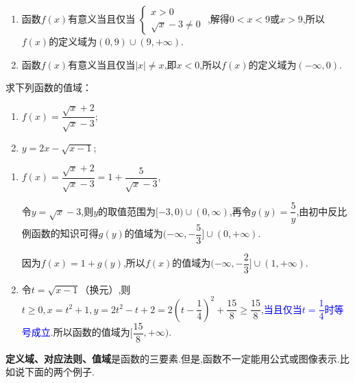 \documentclass[lang=cn,math=cm,chinesefont=nofont,11pt,scheme=chinese,twocol]{elegantbook}
\begin{document}
\begin{solution}
  \begin{enumerate}
    \item 函数$f(x)$有意义当且仅当
     $\begin{cases}
        x>0
        \\\sqrt{x}-3\neq 0
      \end{cases}$
    ,解得$0<x<9$或$x>9$,所以$f(x)$的定义域为$(0,9)\cup (9,+\infty)$.

    \item 函数$f(x)$有意义当且仅当$\left| x \right|\neq x$,即$x<0$,所以$f(x)$的定义域为$(-\infty,0).$
  \end{enumerate}
\end{solution}

\begin{spacing}{2.0}
  \begin{example}
    求下列函数的值域：
  \end{example}
  
  \begin{enumerate}
    \item $f(x)=\dfrac{\sqrt{x}+2}{\sqrt{x}-3}$;
    \item $y=2x-\sqrt{x-1}$;
  \end{enumerate}
\end{spacing}

\begin{solution}
  \begin{enumerate}
    \item $f(x)=\dfrac{\sqrt{x}+2}{\sqrt{x}-3}=1+\dfrac{5}{\sqrt{x}-3}$,
    
    令$y=\sqrt{x}-3$,则$y$的取值范围为$[-3,0)\cup (0,\infty)$,再令$g(y)=\dfrac{5}{y}$,由初中反比例函数的知识可得$g(y)$的值域为$(-\infty,-\dfrac{5}{3}]\cup (0,+\infty)$.

    因为$f(x)=1+g(y)$,所以$f(x)$的值域为$(-\infty,-\dfrac{2}{3}]\cup (1,+\infty)$.

    \item 令$t=\sqrt{x-1}$（换元）,则$t\geqslant 0,x=t^2+1,y=2t^2-t+2=2(t-\dfrac{1}{4})^2+\dfrac{15}{8}\geqslant\dfrac{15}{8}$,\textcolor{blue}{当且仅当$t=\dfrac{1}{4}$时等号成立}.所以函数的值域为$[\dfrac{15}{8},+\infty).$
  \end{enumerate}
\end{solution}

\begin{spacing}{1.5}
  \textbf{定义域、对应法则、值域}是函数的三要素.但是,函数不一定能用公式或图像表示.比如说下面的两个例子.
\end{spacing}
\end{document}
